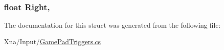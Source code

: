 \subsubsection[{Right}]{\setlength{\rightskip}{0pt plus 5cm}float Right\hspace{0.3cm}{\ttfamily [get]}, {\ttfamily [set]}}\label{structMicrosoft_1_1Xna_1_1Framework_1_1Input_1_1GamePadTriggers_acded93a6693eeeef3f5e24262d89c049}


The documentation for this struct was generated from the following file\+:\begin{DoxyCompactItemize}
\item 
Xna/\+Input/\hyperlink{GamePadTriggers_8cs}{Game\+Pad\+Triggers.\+cs}\end{DoxyCompactItemize}
